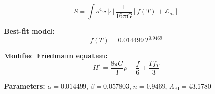 
\begin{equation}
  S = \int d^4x \, |e| \, \frac{1}{16\pi G} \left[ f(T) + \mathcal{L}_m \right]
\end{equation}

\textbf{Best-fit model:}
\begin{equation}
  f(T) = 0.014499 \, T^{0.9469}
\end{equation}

\textbf{Modified Friedmann equation:}
\begin{equation}
  H^2 = \frac{8\pi G}{3} \rho - \frac{f}{6} + \frac{T f_T}{3}
\end{equation}

\textbf{Parameters:}
$\alpha = 0.014499$, \quad
$\beta = 0.057803$, \quad
$n = 0.9469$, \quad
$\Lambda_{\text{BI}} = 43.6780$